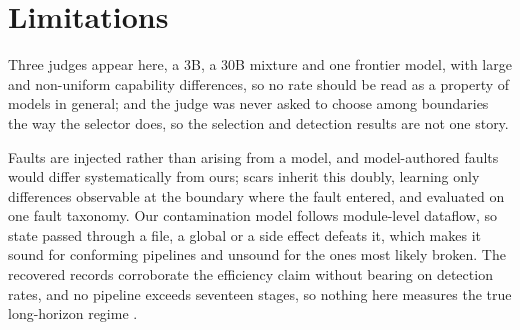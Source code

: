 \section{Limitations}

Three judges appear here, a 3B, a 30B mixture and one frontier model, with large and
non-uniform capability differences, so no rate should be read as a property of models in
general; and the judge was never asked to choose among boundaries the way the selector
does, so the selection and detection results are not one story.

Faults are injected rather than arising from a model, and model-authored faults would
differ systematically from ours; scars inherit this doubly, learning only differences
observable at the boundary where the fault entered, and evaluated on one fault taxonomy.
Our contamination model follows module-level dataflow, so state passed through a file, a
global or a side effect defeats it, which makes it sound for conforming pipelines and
unsound for the ones most likely broken. The recovered records corroborate the efficiency claim without
bearing on detection rates, and no pipeline exceeds seventeen stages, so nothing here
measures the true long-horizon regime \cite{chen2026horizon}.
